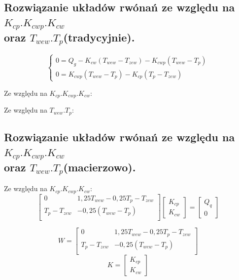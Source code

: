 \documentclass{article}
\begin{document}
\newpage
\begin{flushleft}
\section{Rozwiązanie układów rwónań ze względu na $K_{cp}. K_{cwp}. K_{cw}$ \\oraz $T_{wew}. T_{p}$(tradycyjnie).}
\end{flushleft}
$$
 \begin{cases}
        0=Q_{g} -K_{cw} (T_{wew} - T_{zew})-K_{cwp} (T_{wew} -T_{p})\\
        0=K_{cwp}(T_{wew}-T_{p})-K_{cp}(T_{p}-T_{zew})
\end{cases}
$$

Ze względu na $K_{cp}. K_{cwp}. K_{cw}$:

Ze względu na  $T_{wew}. T_{p}$:

\begin{flushleft}
\section{Rozwiązanie układów rwónań ze względu na $K_{cp}. K_{cwp}. K_{cw}$ \\oraz $T_{wew}. T_{p}$(macierzowo).}
\end{flushleft}

Ze względu na $K_{cp}. K_{cwp}. K_{cw}$:
$$
\begin{bmatrix}
        0 & 1,25T_{wew}-0,25T_{p}-T_{zew}            \\[0.3em]
        T_{p}-T_{zew} & -0,25(T_{wew}-T_{p})            \\[0.3em]
    \end{bmatrix}
    \begin{bmatrix}
        K_{cp}\\
        K_{cw}
    \end{bmatrix}
    =
    \begin{bmatrix}
        Q_{q}\\
        0
    \end{bmatrix}
$$

$$
W=
\begin{bmatrix}
        0 & 1,25T_{wew}-0,25T_{p}-T_{zew}            \\[0.3em]
        T_{p}-T_{zew} & -0,25(T_{wew}-T_{p})            \\[0.3em]
    \end{bmatrix}
$$
$$
K=
\begin{bmatrix}
        K_{cp}\\
        K_{cw}
    \end{bmatrix}
$$
\end{document}
